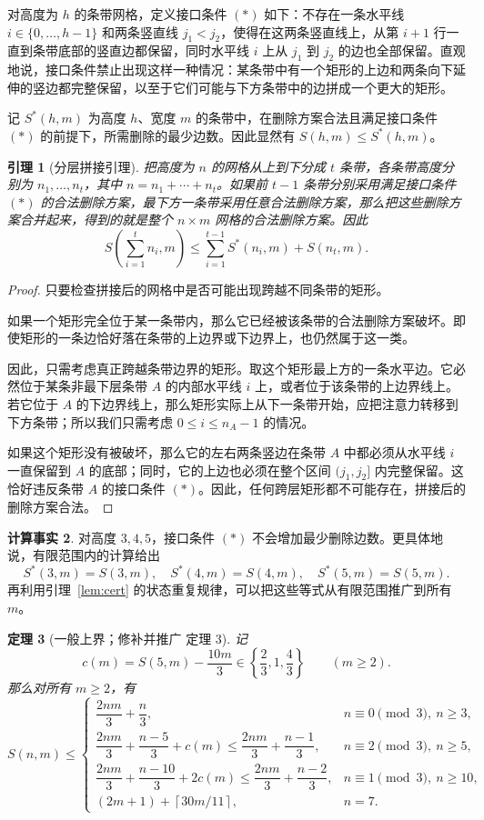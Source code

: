 \documentclass[11pt]{ctexart}
\newtheorem{theorem}{定理}[section]
\newtheorem{lemma}[theorem]{引理}
\theoremstyle{definition}
\newtheorem{fact}[theorem]{计算事实}
\newcommand{\ceil}[1]{\left\lceil #1 \right\rceil}
\begin{document}
对高度为 $h$ 的条带网格，定义接口条件 $(*)$ 如下：不存在一条水平线
$i\in\{0,\ldots,h-1\}$ 和两条竖直线 $j_1<j_2$，使得在这两条竖直线上，从第 $i+1$ 行一直到条带底部的竖直边都保留，同时水平线 $i$ 上从 $j_1$ 到 $j_2$ 的边也全部保留。直观地说，接口条件禁止出现这样一种情况：某条带中有一个矩形的上边和两条向下延伸的竖边都完整保留，以至于它们可能与下方条带中的边拼成一个更大的矩形。

记 $S^*(h,m)$ 为高度 $h$、宽度 $m$ 的条带中，在删除方案合法且满足接口条件 $(*)$ 的前提下，所需删除的最少边数。因此显然有
$S(h,m)\le S^*(h,m)$。

\begin{lemma}[分层拼接引理]\label{lem:stack}
把高度为 $n$ 的网格从上到下分成 $t$ 条带，各条带高度分别为
$n_1,\ldots,n_t$，其中 $n=n_1+\cdots+n_t$。如果前 $t-1$ 条带分别采用满足接口条件 $(*)$ 的合法删除方案，最下方一条带采用任意合法删除方案，那么把这些删除方案合并起来，得到的就是整个 $n\times m$ 网格的合法删除方案。因此
\[
S\left(\sum_{i=1}^t n_i,m\right)
\le
\sum_{i=1}^{t-1}S^*(n_i,m)+S(n_t,m).
\]
\end{lemma}

\begin{proof}
只要检查拼接后的网格中是否可能出现跨越不同条带的矩形。

如果一个矩形完全位于某一条带内，那么它已经被该条带的合法删除方案破坏。即使矩形的一条边恰好落在条带的上边界或下边界上，也仍然属于这一类。

因此，只需考虑真正跨越条带边界的矩形。取这个矩形最上方的一条水平边。它必然位于某条非最下层条带 $A$ 的内部水平线 $i$ 上，或者位于该条带的上边界线上。若它位于 $A$ 的下边界线上，那么矩形实际上从下一条带开始，应把注意力转移到下方条带；所以我们只需考虑 $0\le i\le n_A-1$ 的情况。

如果这个矩形没有被破坏，那么它的左右两条竖边在条带 $A$ 中都必须从水平线 $i$ 一直保留到 $A$ 的底部；同时，它的上边也必须在整个区间 $(j_1,j_2]$ 内完整保留。这恰好违反条带 $A$ 的接口条件 $(*)$。因此，任何跨层矩形都不可能存在，拼接后的删除方案合法。
\end{proof}

\begin{fact}\label{fact:star}
对高度 $3,4,5$，接口条件 $(*)$ 不会增加最少删除边数。更具体地说，有限范围内的计算给出
\[
S^*(3,m)=S(3,m),\quad
S^*(4,m)=S(4,m),\quad
S^*(5,m)=S(5,m).
\]
再利用引理~\ref{lem:cert} 的状态重复规律，可以把这些等式从有限范围推广到所有 $m$。
\end{fact}

\begin{theorem}[一般上界；修补并推广 \cite{NT25} 定理 3]\label{thm:general}
记
\[
c(m)=S(5,m)-\frac{10m}{3}
\in\left\{\frac23,1,\frac43\right\}
\qquad(m\ge2).
\]
那么对所有 $m\ge2$，有
\[
S(n,m)\le
\begin{cases}
\dfrac{2nm}{3}+\dfrac n3,
& n\equiv0\pmod3,\ n\ge3,\\[4pt]
\dfrac{2nm}{3}+\dfrac{n-5}{3}+c(m)
\le\dfrac{2nm}{3}+\dfrac{n-1}{3},
& n\equiv2\pmod3,\ n\ge5,\\[4pt]
\dfrac{2nm}{3}+\dfrac{n-10}{3}+2c(m)
\le\dfrac{2nm}{3}+\dfrac{n-2}{3},
& n\equiv1\pmod3,\ n\ge10,\\[4pt]
(2m+1)+\ceil{30m/11},
& n=7.
\end{cases}
\]
\end{theorem}
\end{document}

